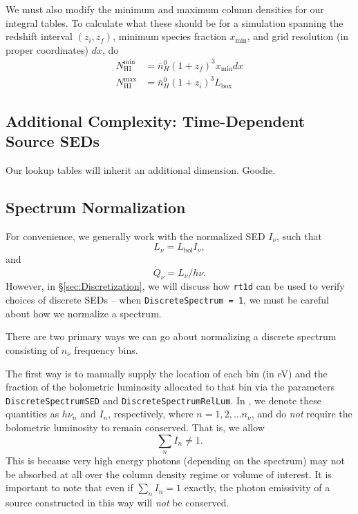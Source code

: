 \documentclass[letterpaper,titlepage,12pt]{article}
\numberwithin{equation}{section}
\newcommand{\HI}{\text{HI}}
\newcommand{\Lbox}{L_{\mathrm{box}}}
\begin{document}
We must also modify the minimum and maximum column densities for our integral tables.  To calculate what these should be for a simulation spanning the redshift interval $(z_i, z_f)$, minimum species fraction $x_{\mathrm{min}}$, and grid resolution (in proper coordinates) $dx$, do
\begin{align}
    N_{\HI}^{\mathrm{min}} & = \bar{n}_H^0 (1 + z_f)^3 x_{\mathrm{min}} dx   \\
    N_{\HI}^{\mathrm{max}} & = \bar{n}_H^0 (1 + z_i)^3 \Lbox
\end{align}    

\subsection{Additional Complexity: Time-Dependent Source SEDs}
Our lookup tables will inherit an additional dimension.  Goodie.



\subsection{Spectrum Normalization}
For convenience, we generally work with the normalized SED $I_{\nu}$, such that 
\begin{equation}
    L_{\nu} = L_{\mathrm{bol}} I_{\nu} ,
\end{equation}    
and 
\begin{equation}
    \dot{Q}_{\nu} = L_{\nu} / h\nu .
\end{equation}    
However, in \S\ref{sec:Discretization}, we will discuss how \texttt{rt1d} can be used to verify choices of discrete SEDs -- when \texttt{DiscreteSpectrum = 1}, we must be careful about how we normalize a spectrum.

There are two primary ways we can go about normalizing a discrete spectrum consisting of $n_{\nu}$ frequency bins.  

The first way is to manually supply the location of each bin (in eV) and the fraction of the bolometric luminosity allocated to that bin via the parameters \texttt{DiscreteSpectrumSED} and \texttt{DiscreteSpectrumRelLum}.  In \citet{Mirocha2012}, we denote these quantities as $h\nu_n$ and $I_n$, respectively, where $n = 1, 2,...n_{\nu}$, and do \textit{not} require the bolometric luminosity to remain conserved.  That is, we allow
\begin{equation}
    \sum_n I_n \neq 1.
\end{equation}    
This is because very high energy photons (depending on the spectrum) may not be absorbed at all over the column density regime or volume of interest.  It is important to note that even if $\sum_n I_n = 1$ exactly, the photon emissivity of a source constructed in this way will \textit{not} be conserved.  
\end{document}
